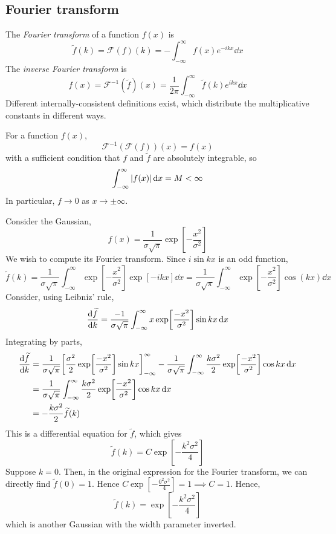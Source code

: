 \subsection{Fourier transform}
\begin{definition}
	The \textit{Fourier transform} of a function \( f(x) \) is
	\[
		\widetilde f(k) = \mathcal F(f)(k) = -\int_{-\infty}^\infty f(x) e^{-ikx} \dd{x}
	\]
	The \textit{inverse Fourier transform} is
	\[
		f(x) = \mathcal F^{-1}(\widetilde f)(x) = \frac{1}{2\pi} \int_{-\infty}^\infty \widetilde f(k) e^{ikx} \dd{x}
	\]
	Different internally-consistent definitions exist, which distribute the multiplicative constants in different ways.
\end{definition}
\begin{theorem}
	For a function \( f(x) \),
	\[
		\mathcal F^{-1} (\mathcal F (f))(x) = f(x)
	\]
	with a sufficient condition that \( f \) and \( \widetilde f \) are absolutely integrable, so
	\[
		\int_{-\infty}^\infty \abs{f(x)} \dd{x} = M < \infty
	\]
	In particular, \( f \to 0 \) as \( x \to \pm \infty \).
\end{theorem}
\begin{example}
	Consider the Gaussian,
	\[
		f(x) = \frac{1}{\sigma \sqrt{\pi}} \exp[-\frac{x^2}{\sigma^2}]
	\]
	We wish to compute its Fourier transform.
	Since \( i \sin kx \) is an odd function,
	\[
		\widetilde f(k) = \frac{1}{\sigma \sqrt{\pi}} \int_{-\infty}^\infty \exp[-\frac{x^2}{\sigma^2}] \exp[-ikx] \dd{x} = \frac{1}{\sigma \sqrt{\pi}} \int_{-\infty}^\infty \exp[-\frac{x^2}{\sigma^2}] \cos(kx) \dd{x}
	\]
	Consider, using Leibniz' rule,
	\[
		\dv{\widetilde f}{k} = \frac{-1}{\sigma \sqrt{\pi}} \int_{-\infty}^\infty x\exp[\frac{-x^2}{\sigma^2}] \sin kx \dd{x}
	\]
	Integrating by parts,
	\begin{align*}
		\dv{\widetilde f}{k} & = \frac{1}{\sigma \sqrt{\pi}} \qty[\frac{\sigma^2}{2} \exp[\frac{-x^2}{\sigma^2}] \sin kx]_{-\infty}^\infty - \frac{1}{\sigma \sqrt{\pi}} \int_{-\infty}^\infty \frac{k\sigma^2}{2} \exp[\frac{-x^2}{\sigma^2}] \cos kx \dd{x} \\
		                     & = \frac{1}{\sigma \sqrt{\pi}} \int_{-\infty}^\infty \frac{k\sigma^2}{2} \exp[\frac{-x^2}{\sigma^2}] \cos kx \dd{x}                                                                                                             \\
		                     & = -\frac{k\sigma^2}{2} \widetilde f(k)
	\end{align*}
	This is a differential equation for \( \widetilde f \), which gives
	\[
		\widetilde f(k) = C \exp[-\frac{k^2\sigma^2}{4}]
	\]
	Suppose \( k = 0 \).
	Then, in the original expression for the Fourier transform, we can directly find \( \widetilde f(0) = 1 \).
	Hence \( C \exp[-\frac{0^2\sigma^2}{4}] = 1 \implies C = 1 \).
	Hence,
	\[
		\widetilde f(k) = \exp[-\frac{k^2\sigma^2}{4}]
	\]
	which is another Gaussian with the width parameter inverted.
\end{example}
